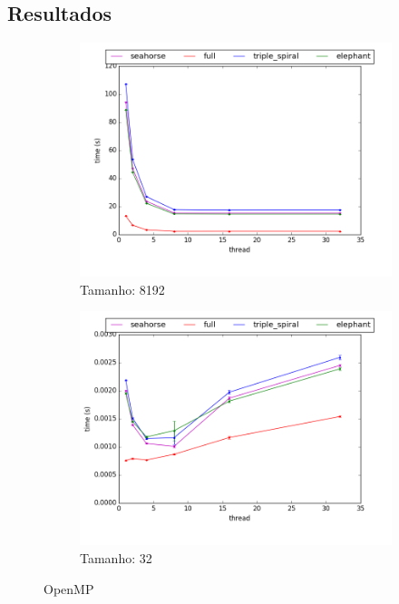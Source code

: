 \documentclass[final,12pt,a4paper]{elsarticle}
\begin{document}
\subsection{Resultados}
\begin{figure}[htpb]
\centering
\begin{subfigure}{.55\textwidth}
  \centering
  \includegraphics[width=1\linewidth]{image6}
  \caption{Tamanho: 8192}
  \label{fig:image6}
\end{subfigure}%
\begin{subfigure}{.55\textwidth}
  \centering
  \includegraphics[width=1\linewidth]{image7}
  \caption{Tamanho: 32}
  \label{fig:image7}
\end{subfigure}
\caption{OpenMP}
\label{fig:openmp}
\end{figure}
\end{document}
